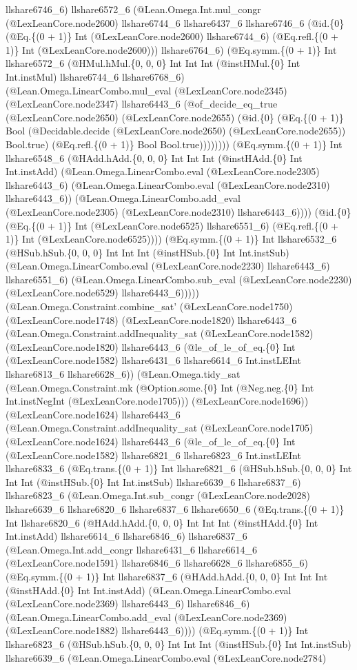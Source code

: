 \documentclass[11pt]{article}
\begin{document}
llshare6746\_6) llshare6572\_6 (@Lean.Omega.Int.mul\_congr (@LexLeanCore.node2600) llshare6744\_6 llshare6437\_6 llshare6746\_6 (@id.\{0\} (@Eq.\{(0 + 1)\} Int (@LexLeanCore.node2600) llshare6744\_6) (@Eq.refl.\{(0 + 1)\} Int (@LexLeanCore.node2600))) llshare6764\_6) (@Eq.symm.\{(0 + 1)\} Int llshare6572\_6 (@HMul.hMul.\{0, 0, 0\} Int Int Int (@instHMul.\{0\} Int Int.instMul) llshare6744\_6 llshare6768\_6) (@Lean.Omega.LinearCombo.mul\_eval (@LexLeanCore.node2345) (@LexLeanCore.node2347) llshare6443\_6 (@of\_decide\_eq\_true (@LexLeanCore.node2650) (@LexLeanCore.node2655) (@id.\{0\} (@Eq.\{(0 + 1)\} Bool (@Decidable.decide (@LexLeanCore.node2650) (@LexLeanCore.node2655)) Bool.true) (@Eq.refl.\{(0 + 1)\} Bool Bool.true)))))))) (@Eq.symm.\{(0 + 1)\} Int llshare6548\_6 (@HAdd.hAdd.\{0, 0, 0\} Int Int Int (@instHAdd.\{0\} Int Int.instAdd) (@Lean.Omega.LinearCombo.eval (@LexLeanCore.node2305) llshare6443\_6) (@Lean.Omega.LinearCombo.eval (@LexLeanCore.node2310) llshare6443\_6)) (@Lean.Omega.LinearCombo.add\_eval (@LexLeanCore.node2305) (@LexLeanCore.node2310) llshare6443\_6)))) (@id.\{0\} (@Eq.\{(0 + 1)\} Int (@LexLeanCore.node6525) llshare6551\_6) (@Eq.refl.\{(0 + 1)\} Int (@LexLeanCore.node6525)))) (@Eq.symm.\{(0 + 1)\} Int llshare6532\_6 (@HSub.hSub.\{0, 0, 0\} Int Int Int (@instHSub.\{0\} Int Int.instSub) (@Lean.Omega.LinearCombo.eval (@LexLeanCore.node2230) llshare6443\_6) llshare6551\_6) (@Lean.Omega.LinearCombo.sub\_eval (@LexLeanCore.node2230) (@LexLeanCore.node6529) llshare6443\_6))))) (@Lean.Omega.Constraint.combine\_sat' (@LexLeanCore.node1750) (@LexLeanCore.node1748) (@LexLeanCore.node1820) llshare6443\_6 (@Lean.Omega.Constraint.addInequality\_sat (@LexLeanCore.node1582) (@LexLeanCore.node1820) llshare6443\_6 (@le\_of\_le\_of\_eq.\{0\} Int (@LexLeanCore.node1582) llshare6431\_6 llshare6614\_6 Int.instLEInt llshare6813\_6 llshare6628\_6)) (@Lean.Omega.tidy\_sat (@Lean.Omega.Constraint.mk (@Option.some.\{0\} Int (@Neg.neg.\{0\} Int Int.instNegInt (@LexLeanCore.node1705))) (@LexLeanCore.node1696)) (@LexLeanCore.node1624) llshare6443\_6 (@Lean.Omega.Constraint.addInequality\_sat (@LexLeanCore.node1705) (@LexLeanCore.node1624) llshare6443\_6 (@le\_of\_le\_of\_eq.\{0\} Int (@LexLeanCore.node1582) llshare6821\_6 llshare6823\_6 Int.instLEInt llshare6833\_6 (@Eq.trans.\{(0 + 1)\} Int llshare6821\_6 (@HSub.hSub.\{0, 0, 0\} Int Int Int (@instHSub.\{0\} Int Int.instSub) llshare6639\_6 llshare6837\_6) llshare6823\_6 (@Lean.Omega.Int.sub\_congr (@LexLeanCore.node2028) llshare6639\_6 llshare6820\_6 llshare6837\_6 llshare6650\_6 (@Eq.trans.\{(0 + 1)\} Int llshare6820\_6 (@HAdd.hAdd.\{0, 0, 0\} Int Int Int (@instHAdd.\{0\} Int Int.instAdd) llshare6614\_6 llshare6846\_6) llshare6837\_6 (@Lean.Omega.Int.add\_congr llshare6431\_6 llshare6614\_6 (@LexLeanCore.node1591) llshare6846\_6 llshare6628\_6 llshare6855\_6) (@Eq.symm.\{(0 + 1)\} Int llshare6837\_6 (@HAdd.hAdd.\{0, 0, 0\} Int Int Int (@instHAdd.\{0\} Int Int.instAdd) (@Lean.Omega.LinearCombo.eval (@LexLeanCore.node2369) llshare6443\_6) llshare6846\_6) (@Lean.Omega.LinearCombo.add\_eval (@LexLeanCore.node2369) (@LexLeanCore.node1882) llshare6443\_6)))) (@Eq.symm.\{(0 + 1)\} Int llshare6823\_6 (@HSub.hSub.\{0, 0, 0\} Int Int Int (@instHSub.\{0\} Int Int.instSub) llshare6639\_6 (@Lean.Omega.LinearCombo.eval (@LexLeanCore.node2784) 
\end{document}
